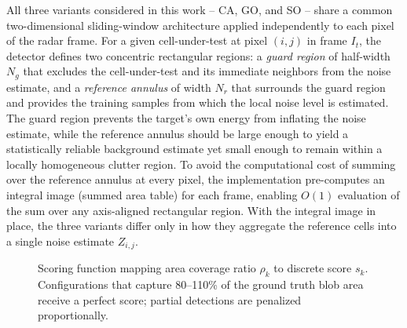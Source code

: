 \documentclass[conf]{new-aiaa}
\begin{document}
All three variants considered in this work -- CA, GO, and SO -- share a common two-dimensional sliding-window architecture applied independently to each pixel of the radar frame. For a given cell-under-test at pixel $(i,j)$ in frame $I_t$, the detector defines two concentric rectangular regions: a \emph{guard region} of half-width $N_g$ that excludes the cell-under-test and its immediate neighbors from the noise estimate, and a \emph{reference annulus} of width $N_r$ that surrounds the guard region and provides the training samples from which the local noise level is estimated. The guard region prevents the target's own energy from inflating the noise estimate, while the reference annulus should be large enough to yield a statistically reliable background estimate yet small enough to remain within a locally homogeneous clutter region. To avoid the computational cost of summing over the reference annulus at every pixel, the implementation pre-computes an integral image (summed area table) \cite{Crow1984} for each frame, enabling $O(1)$ evaluation of the sum over any axis-aligned rectangular region. With the integral image in place, the three variants differ only in how they aggregate the reference cells into a single noise estimate $Z_{i,j}$.

\begin{figure}[t]
    \centering
    \caption{Scoring function mapping area coverage ratio $\rho_k$ to discrete score $s_k$. Configurations that capture 80--110\% of the ground truth blob area receive a perfect score; partial detections are penalized proportionally.}
    \label{fig:scoring_function}
\end{figure}
\end{document}
